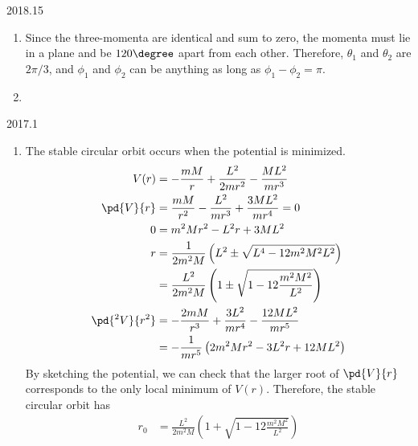 \documentclass[12pt]{article}
\begin{document}
\begin{solution}{2018.15}
\begin{enumerate}
\item Since the three-momenta are identical and sum to zero,
the momenta must lie in a plane and be $120\degree$ apart from each other.
Therefore, $\theta_{1}$ and $\theta_{2}$ are $2\pi/3$, and $\phi_{1}$ and $\phi_{2}$ can be anything as long as $\phi_{1} - \phi_{2} = \pi$.

\item

\end{enumerate}
\end{solution}


\begin{solution}{2017.1}
  \begin{enumerate}
    \item The stable circular orbit occurs when the potential is minimized.
    \begin{align*}
      V(r) & = -\frac{mM}{r} + \frac{L^{2}}{2mr^{2}} - \frac{ML^2}{m r^3} \\
      \pd{V}{r} & = \frac{mM}{r^2} - \frac{L^2}{mr^3} + \frac{3ML^2}{mr^4} = 0 \\
      0 & = m^2 M r^2 - L^2 r + 3ML^2 \\
      r & = \frac{1}{2m^2 M} \left( L^2 \pm \sqrt{L^4 - 12m^2 M^2 L^2} \right) \\
      & = \frac{L^2}{2m^2 M} \left( 1 \pm \sqrt{1 - 12 \frac{m^2 M^2}{L^2}} \right) \\
      \pd{^2 V}{r^2} & = -\frac{2mM}{r^3} + \frac{3L^2}{mr^4} - \frac{12ML^2}{mr^5} \\
      & = -\frac{1}{mr^5} \left( 2m^2 M r^2 - 3L^2 r + 12ML^2 \right)
    \end{align*}
    By sketching the potential, we can check that the larger root of $\pd{V}{r}$ corresponds to the only
    local minimum of $V(r)$. Therefore, the stable circular orbit has
    \begin{align*}
      r_0 & = \frac{L^2}{2m^2 M} \left( 1 + \sqrt{1 - 12 \frac{m^2 M^2}{L^2}} \right) \\
    \end{align*}


\end{enumerate}
\end{solution}
\end{document}
